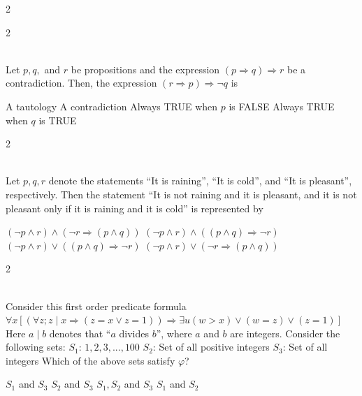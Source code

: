 \documentclass[12pt]{exam}
\begin{document}
\begin{questions}
\begin{multicols*}{2}
\end{multicols*}
\vspace{0.6cm}
\newpage
\begin{multicols*}{2}

 \\[0.2cm]
{\Large Let $p, q,$ and $r$ be propositions and the expression $(p \Rightarrow q) \Rightarrow r$ be a contradiction. Then, the expression $(r \Rightarrow p) \Rightarrow \neg q$ is}
\begin{choices}
  \choice A tautology
  \choice A contradiction
  \choice Always TRUE when $p$ is FALSE
  \choice Always TRUE when $q$ is TRUE
\end{choices}

\end{multicols*}
\vspace{0.6cm}
\newpage
\begin{multicols*}{2}

 \\[0.2cm]
{\Large Let $p, q, r$ denote the statements “It is raining”, “It is cold”, and “It is pleasant”, respectively. Then the statement “It is not raining and it is pleasant, and it is not pleasant only if it is raining and it is cold” is represented by}
\begin{choices}
  \choice $(\neg p \wedge r) \wedge (\neg r \Rightarrow (p \wedge q))$
  \choice $(\neg p \wedge r) \wedge ((p \wedge q) \Rightarrow \neg r)$
  \choice $(\neg p \wedge r) \vee ((p \wedge q) \Rightarrow \neg r)$
  \choice $(\neg p \wedge r) \vee (\neg r \Rightarrow (p \wedge q))$
\end{choices}

\end{multicols*}
\vspace{0.6cm}
\newpage
\begin{multicols*}{2}

 \\[0.2cm]
{\Large Consider this first order predicate formula\newline
$\forall x[(\forall z; z \mid x \Rightarrow (z = x \vee z = 1)) \Rightarrow \exists u (w > x) \vee (w = z) \vee (z = 1)]$\newline
Here $a \mid b$ denotes that “$a$ divides $b$”, where $a$ and $b$ are integers. Consider the following sets:\newline
$S_1$: ${1, 2, 3, ..., 100}$\newline
$S_2$: Set of all positive integers\newline
$S_3$: Set of all integers\newline
Which of the above sets satisfy $\varphi$?}
\begin{choices}
  \choice $S_1$ and $S_3$
  \choice $S_2$ and $S_3$
  \choice $S_1, S_2$ and $S_3$
  \choice $S_1$ and $S_2$
\end{choices}


\end{multicols*}
\end{questions}
\end{document}
